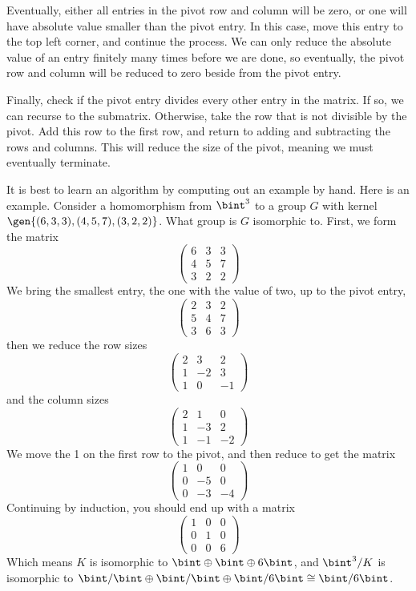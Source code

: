 Eventually, either all entries in the pivot row and column will be zero, or one will have absolute value smaller than the pivot entry. In this case, move this entry to the top left corner, and continue the process. We can only reduce the absolute value of an entry finitely many times before we are done, so eventually, the pivot row and column will be reduced to zero beside from the pivot entry.

Finally, check if the pivot entry divides every other entry in the matrix. If so, we can recurse to the submatrix. Otherwise, take the row that is not divisible by the pivot. Add this row to the first row, and return to adding and subtracting the rows and columns. This will reduce the size of the pivot, meaning we must eventually terminate.

It is best to learn an algorithm by computing out an example by hand. Here is an example. Consider a homomorphism from $\bint^3$ to a group $G$ with kernel $\gen{(6,3,3),(4,5,7),(3,2,2)}$. What group is $G$ isomorphic to. First, we form the matrix
%
\[ \begin{pmatrix} 6 & 3 & 3 \\ 4 & 5 & 7 \\ 3 & 2 & 2 \end{pmatrix} \]
%
We bring the smallest entry, the one with the value of two, up to the pivot entry,
%
\[ \begin{pmatrix} 2 & 3 & 2\\ 5 & 4 & 7\\ 3 & 6 & 3 \end{pmatrix} \]
%
then we reduce the row sizes
%
\[ \begin{pmatrix} 2 & 3 & 2\\ 1 & -2 & 3\\1 & 0 & -1 \end{pmatrix} \]
%
and the column sizes
%
\[ \begin{pmatrix} 2 & 1 & 0\\ 1 & -3 & 2\\ 1 & -1 & -2 \end{pmatrix} \]
%
We move the 1 on the first row to the pivot, and then reduce to get the matrix
%
\[ \begin{pmatrix} 1 & 0 & 0\\ 0 & -5 & 0\\ 0 & -3 & -4 \end{pmatrix} \]
%
Continuing by induction, you should end up with a matrix
%
\[ \begin{pmatrix} 1 & 0 & 0\\ 0 & 1 & 0\\ 0 & 0 & 6 \end{pmatrix} \]
%
Which means $K$ is isomorphic to $\bint \oplus \bint \oplus 6\bint$, and $\bint^3/K$ is isomorphic to $\bint/\bint \oplus \bint/\bint \oplus \bint/6\bint \cong \bint/6\bint$.

